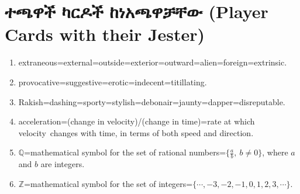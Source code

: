 \documentclass[a4paper,12pt]{article}
\newenvironment{geez}{\geezfont}{}
\theoremstyle{mystyle}
\numberwithin{equation}{section}
\numberwithin{theorem}{section}
\numberwithin{proposition}{section}
\numberwithin{example}{section}
\numberwithin{remark}{section}
\numberwithin{lemma}{section}
\numberwithin{corollary}{section}
\numberwithin{definition}{section}
\numberwithin{amharicdefinition}{section}
\begin{document}
\section{\begin{geez}ተጫዋች ካርዶች ከነአጫዋቻቸው (Player Cards with their Jester)\end{geez}}
\label{S:3}
\begin{enumerate}
\item extraneous=external=outside=exterior=outward=alien=foreign=extrinsic.
\item provocative=suggestive=erotic=indecent=titillating.
\item Rakish=dashing=sporty=stylish=debonair=jaunty=dapper=disreputable.
\item acceleration=(change in velocity)/(change in time)=rate at which velocity changes with time, in terms of both speed and direction.
\item $\mathbb{Q}$=mathematical symbol for the set of rational numbers=$\{\frac{a}{b}, ~b\ne 0\}$, where $a$ and $b$ are integers.
\item $\mathbb{Z}$=mathematical symbol for the set of integers=$\{\cdots,-3,-2,-1,0, 1,2,3,\cdots\}$.
\end{enumerate}
\printbibliography
\end{document}
